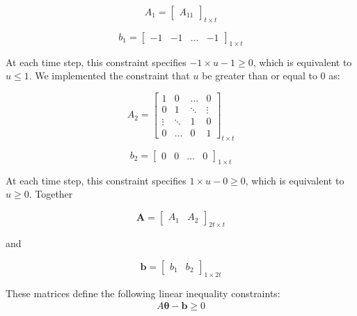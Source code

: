 \documentclass[12pt, oneside]{article}   	%
\begin{document}
\begin{equation}
A_1=
  \begin{bmatrix}
   A_{11} 
   \end{bmatrix}_{t \times t}
\end{equation}

\begin{equation}
b_1=
  \begin{bmatrix}
    -1 & -1 & \dots & -1
  \end{bmatrix}_{ 1 \times t }
\end{equation}

\noindent At each time step, this constraint specifies $ -1 \times u - 1 \geq 0$, which is equivalent to $  u \leq 1$. We implemented the constraint that $u$ be greater than or equal to 0 as:

\begin{equation}
A_2=
  \begin{bmatrix}
    1		& 0 	 	& \ldots 	& 0  	 \\
    0 	 	& 1  		& \ddots 	& \vdots  \\
    \vdots   & \ddots 	& 1		& 0  \\
    0 		& \ldots 	& 0 		& 1  
  \end{bmatrix}_{ t \times t}
\end{equation}

\begin{equation}
b_2=
  \begin{bmatrix}
    0 & 0 & \dots & 0
  \end{bmatrix}_{ 1 \times t }
\end{equation}

\noindent At each time step, this constraint specifies $ 1 \times u - 0 \geq 0$, which is equivalent to $  u \geq 0$. Together 

\begin{equation}
\bm{A} = \begin{bmatrix}
    A_1 & A_2 
\end{bmatrix}_{ 2t \times t }
\end{equation}

\noindent and

\begin{equation}
\bm{b} = \begin{bmatrix}
    b_1 & b_2 
\end{bmatrix}_{ 1 \times 2t }
\end{equation}

\noindent These matrices define the following linear inequality constraints:
\begin{align}
A \bm{\theta} - \bm{b} \geq 0 
\end{align}
\end{document}
